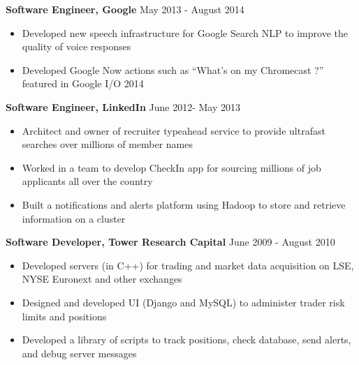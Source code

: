 \documentclass[margin, 10pt]{res} %
\begin{document}
\begin{resume}
{\bf Software Engineer, Google} \hfill May 2013 - August 2014 
\begin{itemize}
\item  Developed new speech infrastructure for Google Search NLP to improve the quality of voice responses
\item Developed Google Now actions such as “What’s on my Chromecast ?” featured in Google I/O 2014
\end{itemize} 

{\bf Software Engineer, LinkedIn} \hfill June 2012- May 2013 
\begin{itemize}
\item Architect and owner of recruiter typeahead service to provide ultrafast searches over millions of member names
\item Worked in a team to develop CheckIn app for sourcing millions of job applicants all over the country
\item Built a notifications and alerts platform using Hadoop to store and retrieve information on a cluster
\end{itemize} 

{\bf Software Developer, Tower Research Capital} \hfill June 2009 - August 2010 
\begin{itemize}
\item Developed servers (in C++) for trading and market data acquisition on LSE, NYSE Euronext and other exchanges
\item Designed and developed UI (Django and MySQL) to administer trader risk limits and positions
\item Developed a library of scripts to track positions, check database, send alerts, and debug server messages
\end{itemize} 


\end{resume}
\end{document}
